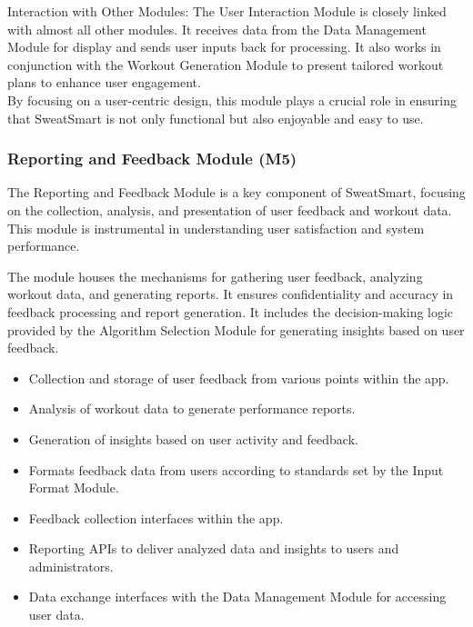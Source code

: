 \documentclass[12pt, titlepage]{article}
\begin{document}
Interaction with Other Modules: The User Interaction Module is closely linked with almost all other modules. It receives data from the Data Management Module for display and sends user inputs back for processing. It also works in conjunction with the Workout Generation Module to present tailored workout plans to enhance user engagement.
\\

By focusing on a user-centric design, this module plays a crucial role in ensuring that SweatSmart is not only functional but also enjoyable and easy to use.

\subsubsection{Reporting and Feedback Module (M5)}

The Reporting and Feedback Module is a key component of SweatSmart, focusing on the collection, analysis, and presentation of user feedback and workout data. This module is instrumental in understanding user satisfaction and system performance.

\begin{description}[leftmargin=0pt]
\item[Secrets:]
The module houses the mechanisms for gathering user feedback, analyzing workout data, and generating reports. It ensures confidentiality and accuracy in feedback processing and report generation. It includes the decision-making logic provided by the Algorithm Selection Module for generating insights based on user feedback.
\end{description}

\begin{description}[leftmargin=0pt]
\item[Services:]
\end{description}
\begin{itemize}[leftmargin=*]
\item Collection and storage of user feedback from various points within the app.
\item Analysis of workout data to generate performance reports.
\item Generation of insights based on user activity and feedback.
\item Formats feedback data from users according to standards set by the Input Format Module.
\end{itemize}

\begin{description}[leftmargin=0pt]
\item[Interfaces:]
\end{description}
\begin{itemize}[leftmargin=*]
\item Feedback collection interfaces within the app.
\item Reporting APIs to deliver analyzed data and insights to users and administrators.
\item Data exchange interfaces with the Data Management Module for accessing user data.
\end{itemize}
\end{document}
